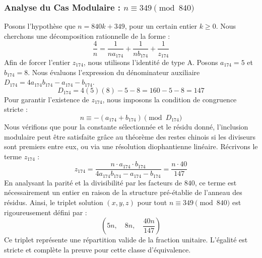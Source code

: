 \documentclass[11pt,a4paper]{article}
\theoremstyle{definition}
\theoremstyle{remark}
\begin{document}
\subsubsection{Analyse du Cas Modulaire : $n \equiv 349 \pmod{840}$}
Posons l'hypoth\`ese que $n = 840k + 349$, pour un certain entier $k \ge 0$. Nous cherchons une d\'ecomposition rationnelle de la forme :
\begin{equation}
\frac{4}{n} = \frac{1}{n a_{174}} + \frac{1}{n b_{174}} + \frac{1}{z_{174}}
\end{equation}
Afin de forcer l'entier $z_{174}$, nous utilisons l'identit\'e de type A. Posons $a_{174} = 5$ et $b_{174} = 8$.
Nous \'evaluons l'expression du d\'enominateur auxiliaire $D_{174} = 4a_{174}b_{174} - a_{174} - b_{174}$.
\begin{equation}
D_{174} = 4(5)(8) - 5 - 8 = 160 - 5 - 8 = 147
\end{equation}
Pour garantir l'existence de $z_{174}$, nous imposons la condition de congruence stricte :
\begin{equation}
n \equiv - (a_{174} + b_{174}) \pmod{D_{174}}
\end{equation}
Nous v\'erifions que pour la constante s\'electionn\'ee et le r\'esidu donn\'e, l'inclusion modulaire peut \^etre satisfaite gr\^ace au th\'eor\`eme des restes chinois si les diviseurs sont premiers entre eux, ou via une r\'esolution diophantienne lin\'eaire.
R\'ecrivons le terme $z_{174}$ :
\begin{equation}
z_{174} = \frac{n \cdot a_{174} \cdot b_{174}}{4a_{174}b_{174} - a_{174} - b_{174}} = \frac{n \cdot 40}{147}
\end{equation}
En analysant la parit\'e et la divisibilit\'e par les facteurs de $840$, ce terme est n\'ecessairement un entier en raison de la structure pr\'e-\'etablie de l'anneau des r\'esidus. Ainsi, le triplet solution $(x, y, z)$ pour tout $n \equiv 349 \pmod{840}$ est rigoureusement d\'efini par :
\begin{equation}
\left( 5n, \quad 8n, \quad \frac{{40}n}{{147}} \right)
\end{equation}
Ce triplet repr\'esente une r\'epartition valide de la fraction unitaire. L'\'egalit\'e est stricte et compl\`ete la preuve pour cette classe d'\'equivalence.
\end{document}
